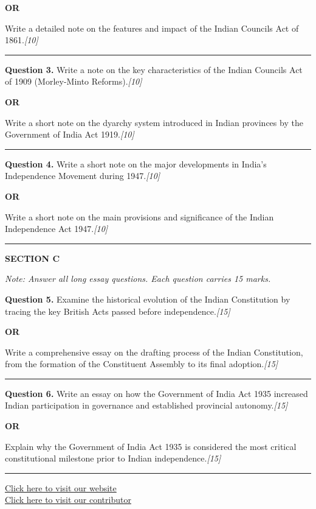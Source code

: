 \documentclass[11pt,a4paper]{article}
\newcommand{\pts}[1]{\hfill   \textit{[#1]}}
\begin{document}
\centerline{   \textbf{OR}}




\noindent Write a detailed note on the features and impact of the Indian Councils Act of 1861.\pts{10}

\medskip\rule{\linewidth}{0.1pt}\medskip




\noindent   \textbf{Question 3.} Write a note on the key characteristics of the Indian Councils Act of 1909 (Morley-Minto Reforms).\pts{10}

\centerline{   \textbf{OR}}




\noindent Write a short note on the dyarchy system introduced in Indian provinces by the Government of India Act 1919.\pts{10}

\medskip\rule{\linewidth}{0.1pt}\medskip




\noindent   \textbf{Question 4.} Write a short note on the major developments in India's Independence Movement during 1947.\pts{10}

\centerline{   \textbf{OR}}




\noindent Write a short note on the main provisions and significance of the Indian Independence Act 1947.\pts{10}

\bigskip
\rule{\linewidth}{0.2pt}
\medskip

\centerline{   \textbf{SECTION C}}
\smallskip



\noindent   \textit{Note: Answer all long essay questions. Each question carries 15 marks.}

\bigskip




\noindent   \textbf{Question 5.} Examine the historical evolution of the Indian Constitution by tracing the key British Acts passed before independence.\pts{15}

\centerline{   \textbf{OR}}




\noindent Write a comprehensive essay on the drafting process of the Indian Constitution, from the formation of the Constituent Assembly to its final adoption.\pts{15}

\medskip\rule{\linewidth}{0.1pt}\medskip




\noindent   \textbf{Question 6.} Write an essay on how the Government of India Act 1935 increased Indian participation in governance and established provincial autonomy.\pts{15}

\centerline{   \textbf{OR}}




\noindent Explain why the Government of India Act 1935 is considered the most critical constitutional milestone prior to Indian independence.\pts{15}

\vfill
\rule{\linewidth}{0.4pt}

\begin{center}\small
\href{https://bhu-exam.vercel.app/}{Click here to visit our website}\\[4pt]
\href{https://me-aryan.vercel.app/}{Click here to visit our contributor}
\end{center}
\end{document}
